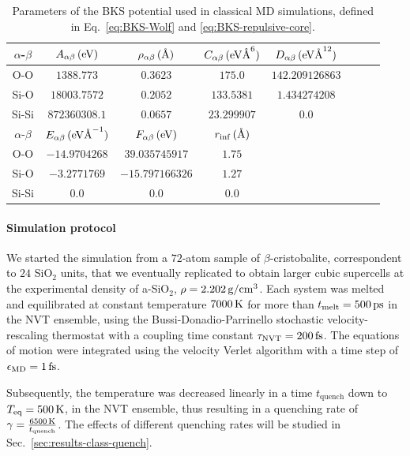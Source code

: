 \begin{table}[!tb]
    \centering
    \begin{tabular}{c|ccccccc}
        $\alpha$-$\beta$ & $A_{\alpha\beta}\,\mathrm{(eV)}$ & $\rho_{\alpha\beta}\,\mathrm{({\mbox{\AA}})}$ & $C_{\alpha\beta}\,\mathrm{(eV{\mbox{\AA}}^6)}$ & $D_{\alpha\beta}\,\mathrm{(eV{\mbox{\AA}}^{12})}$ \\
        \hline
        O-O   & $1388.773$    & $0.3623$ & $175.0$     & $142.209126863$ \\
        Si-O  & $18003.7572$  & $0.2052$ & $133.5381$  & $1.434274208$ \\
        Si-Si & $872360308.1$ & $0.0657$ & $23.299907$ & $0.0$ \\
        \hline
        \hline
        $\alpha$-$\beta$ & $E_{\alpha\beta}\,\mathrm{(eV{\mbox{\AA}}^{-1})}$ & $F_{\alpha\beta}\,\mathrm{(eV)}$ & $r_{\mathrm{inf}}\,\mathrm{({\mbox{\AA}})}$ \\
        \hline
        O-O   & $-14.9704268$ & $39.035745917$  & $1.75$ \\
        Si-O  & $-3.2771769$  & $-15.797166326$ & $1.27$ \\ 
        Si-Si & $0.0$         & $0.0$           & $0.0$
    \end{tabular}
    \caption{Parameters of the BKS potential used in classical MD simulations, defined in Eq.~\eqref{eq:BKS-Wolf} and \eqref{eq:BKS-repulsive-core}.}
    \label{tab:BKS-table}
\end{table}


\paragraph{Simulation protocol}
We started the simulation from a $72$-atom sample of $\beta$-cristobalite, correspondent to $24$ SiO$_2$ units, that we eventually replicated to obtain larger cubic supercells at the experimental density of a-SiO$_2$, $\rho = 2.202\,\mathrm{g/cm^3}$. 
Each system was melted and equilibrated at constant temperature $7000\,\mathrm{K}$ for more than $t_{\mathrm{melt}} = 500\,\mathrm{ps}$ in the NVT ensemble, using the Bussi-Donadio-Parrinello stochastic velocity-rescaling thermostat \cite{Bussi:2007cs} with a coupling time constant $\tau_\mathrm{NVT}=200\,\mathrm{fs}$. The equations of motion were integrated using the velocity Verlet algorithm with a time step of $\epsilon_\mathrm{MD}=1\,\mathrm{fs}$. 

Subsequently, the temperature was decreased linearly in a time $t_{\mathrm{quench}}$ down to $T_{\mathrm{eq}}=500\,\mathrm{K}$, in the NVT ensemble, thus resulting in a quenching rate of $\gamma = \frac{6500\,\mathrm{K}}{t_{\mathrm{quench}}}$. The effects of different quenching rates will be studied in Sec.~\ref{sec:results-class-quench}. 

